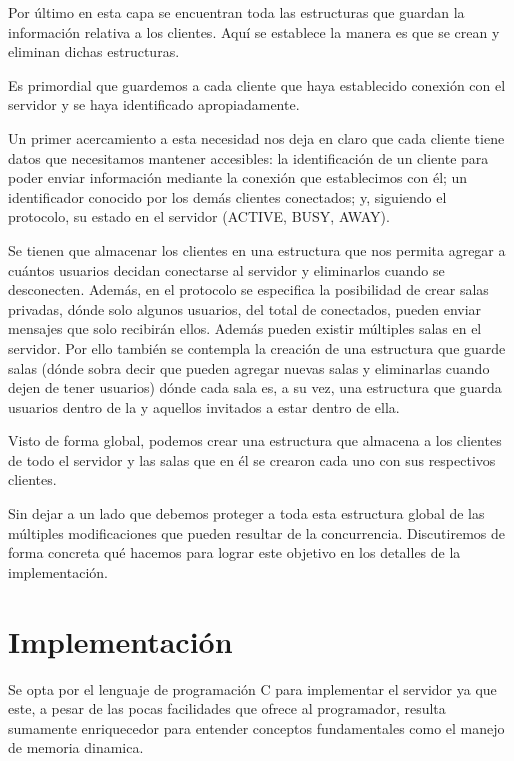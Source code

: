 \documentclass{replab}
\begin{document}
    Por último en esta capa se encuentran toda las estructuras que
    guardan la información relativa a los clientes. Aquí se establece
    la manera es que se crean y eliminan dichas estructuras.

    Es primordial que guardemos a cada cliente que haya establecido
    conexión con el servidor y se haya identificado apropiadamente.

    Un primer acercamiento a esta necesidad nos deja en claro que cada
    cliente tiene datos que necesitamos mantener accesibles: la
    identificación de un cliente para poder enviar información
    mediante la conexión que establecimos con él; un identificador
    conocido por los demás clientes conectados; y, siguiendo el
    protocolo, su estado en el servidor (ACTIVE, BUSY, AWAY).

    Se tienen que almacenar los clientes en una estructura que nos
    permita agregar a cuántos usuarios decidan conectarse al servidor
    y eliminarlos cuando se desconecten. Además, en el protocolo se
    especifica la posibilidad de crear salas privadas, dónde solo
    algunos usuarios, del total de conectados, pueden enviar mensajes
    que solo recibirán ellos. Además pueden existir múltiples salas en
    el servidor. Por ello también se contempla la creación de una
    estructura que guarde salas (dónde sobra decir que pueden agregar
    nuevas salas y eliminarlas cuando dejen de tener usuarios) dónde
    cada sala es, a su vez, una estructura que guarda usuarios dentro
    de la y aquellos invitados a estar dentro de ella.

    Visto de forma global, podemos crear una estructura que almacena a
    los clientes de todo el servidor y las salas que en él se crearon
    cada uno con sus respectivos clientes.

    Sin dejar a un lado que debemos proteger a toda esta estructura
    global de las múltiples modificaciones que pueden resultar de la
    concurrencia. Discutiremos de forma concreta qué hacemos para
    lograr este objetivo en los detalles de la implementación. 

	\section{Implementación}

    Se opta por el lenguaje de programación C para implementar el
    servidor ya que este, a pesar de las pocas facilidades que ofrece
    al programador, resulta sumamente enriquecedor para entender
    conceptos fundamentales como el manejo de memoria dinamica.
\end{document}
